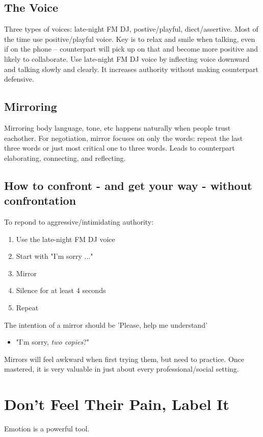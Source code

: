 \documentclass{summary}
\begin{document}
\subsection{The Voice}
Three types of voices: late-night FM DJ, postive/playful, diect/assertive. Most of the time use positive/playful voice. Key is to relax and smile when talking, even if on the phone -- counterpart will pick up on that and become more positive and likely to collaborate. Use late-night FM DJ voice by inflecting voice downward and talking slowly and clearly. It increases authority without making counterpart defensive.

\subsection{Mirroring}
Mirroring body language, tone, etc happens naturally when people trust eachother. For negotiation, mirror focuses on only the words: repeat the last three words or just most critical one to three words. Leads to counterpart elaborating, connecting, and reflecting.

\subsection{How to confront - and get your way - without confrontation}
To repond to aggressive/intimidating authority:
\begin{enumerate}
  \item Use the late-night FM DJ voice
  \item Start with "I'm sorry ..."
  \item Mirror
  \item Silence for at least 4 seconds
  \item Repeat
\end{enumerate}
The intention of a mirror should be 'Please, help me understand'
\begin{itemize}
  \item "I'm sorry, \textit{two copies}?"
\end{itemize}

Mirrors will feel awkward when first trying them, but need to practice. Once mastered, it is very valuable in just about every professional/social setting.

\section{Don't Feel Their Pain, Label It}
Emotion is a powerful tool.
\end{document}
